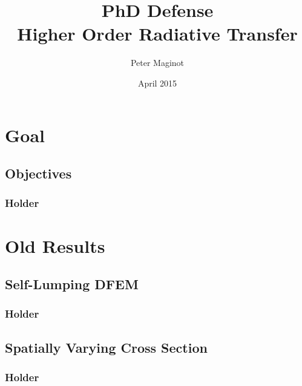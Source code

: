 \documentclass{beamer}
\title{PhD Defense \\ Higher Order Radiative Transfer}
\author{Peter Maginot}\institute{Texas A\&M University- Department of Nuclear Engineering}
\date{April 2015}
\newif\ifplacelogo %
\begin{document}
\placelogofalse
\begin{frame}
\titlepage


\end{frame}


\placelogofalse


\section{Goal}
\subsection{Objectives}
\begin{frame}
\frametitle{Holder}
\end{frame}

\section{Old Results}
\subsection{Self-Lumping DFEM}
\begin{frame}
\frametitle{Holder}
\end{frame}

\subsection{Spatially Varying Cross Section}
\begin{frame}
\frametitle{Holder}
\end{frame}
\end{document}

